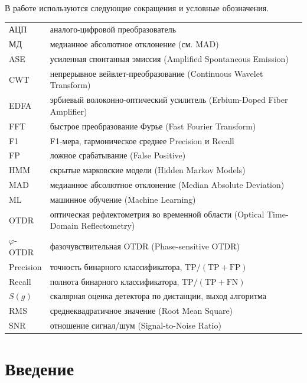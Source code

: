 \documentclass[12pt,a4paper]{extarticle}
\begin{document}
В работе используются следующие сокращения и условные обозначения.

\vspace{6pt}
\noindent
\begin{tabular}{@{}p{2.8cm} p{12.3cm}@{}}
АЦП & аналого-цифровой преобразователь \\
МД  & медианное абсолютное отклонение (см. MAD) \\
ASE & усиленная спонтанная эмиссия (Amplified Spontaneous Emission) \\
CWT & непрерывное вейвлет-преобразование (Continuous Wavelet Transform) \\
EDFA & эрбиевый волоконно-оптический усилитель (Erbium-Doped Fiber Amplifier) \\
FFT & быстрое преобразование Фурье (Fast Fourier Transform) \\
F1 & F1-мера, гармоническое среднее Precision и Recall \\
FP & ложное срабатывание (False Positive) \\
HMM & скрытые марковские модели (Hidden Markov Models) \\
MAD & медианное абсолютное отклонение (Median Absolute Deviation) \\
ML & машинное обучение (Machine Learning) \\
OTDR & оптическая рефлектометрия во временной области (Optical Time-Domain Reflectometry) \\
$\varphi$-OTDR & фазочувствительная OTDR (Phase-sensitive OTDR) \\
Precision & точность бинарного классификатора, $\mathrm{TP}/(\mathrm{TP}+\mathrm{FP})$ \\
Recall & полнота бинарного классификатора, $\mathrm{TP}/(\mathrm{TP}+\mathrm{FN})$ \\
$S(g)$ & скалярная оценка детектора по дистанции, выход алгоритма \\
RMS & среднеквадратичное значение (Root Mean Square) \\
SNR & отношение сигнал/шум (Signal-to-Noise Ratio) \\
\end{tabular}

\newpage

\section{Введение}
\end{document}
